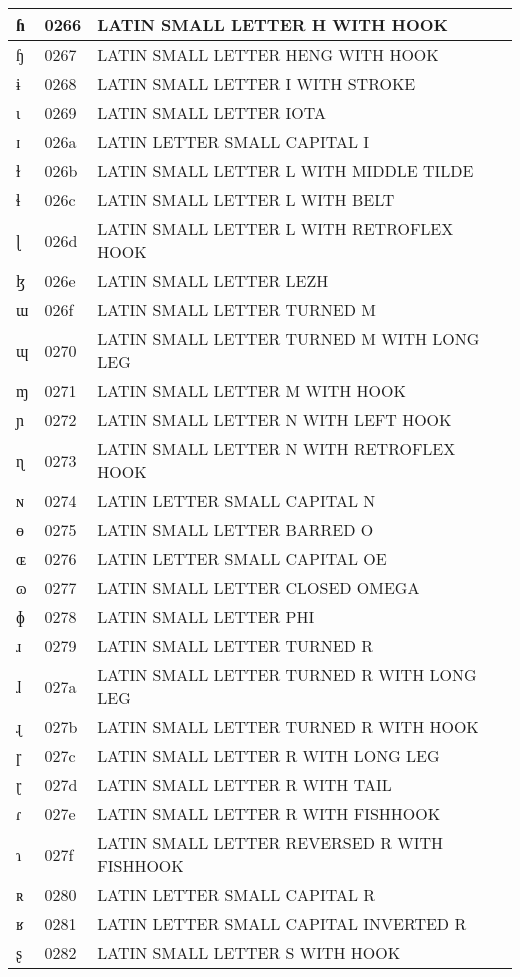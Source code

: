 \documentclass[12pt,letterpaper,openany]{book}
\begin{document}
\begin{center}
\begin{supertabular}{|m{0.25in}|m{0.5in}|m{4in}|}
ɦ & 0266 & LATIN SMALL LETTER H WITH HOOK\\\hline
ɧ & 0267 & LATIN SMALL LETTER HENG WITH HOOK\\\hline
ɨ & 0268 & LATIN SMALL LETTER I WITH STROKE\\\hline
ɩ & 0269 & LATIN SMALL LETTER IOTA\\\hline
ɪ & 026a & LATIN LETTER SMALL CAPITAL I\\\hline
ɫ & 026b & LATIN SMALL LETTER L WITH MIDDLE TILDE\\\hline
ɬ & 026c & LATIN SMALL LETTER L WITH BELT\\\hline
ɭ & 026d & LATIN SMALL LETTER L WITH RETROFLEX HOOK\\\hline
ɮ & 026e & LATIN SMALL LETTER LEZH\\\hline
ɯ & 026f & LATIN SMALL LETTER TURNED M\\\hline
ɰ & 0270 & LATIN SMALL LETTER TURNED M WITH LONG LEG\\\hline
ɱ & 0271 & LATIN SMALL LETTER M WITH HOOK\\\hline
ɲ & 0272 & LATIN SMALL LETTER N WITH LEFT HOOK\\\hline
ɳ & 0273 & LATIN SMALL LETTER N WITH RETROFLEX HOOK\\\hline
ɴ & 0274 & LATIN LETTER SMALL CAPITAL N\\\hline
ɵ & 0275 & LATIN SMALL LETTER BARRED O\\\hline
ɶ & 0276 & LATIN LETTER SMALL CAPITAL OE\\\hline
ɷ & 0277 & LATIN SMALL LETTER CLOSED OMEGA\\\hline
ɸ & 0278 & LATIN SMALL LETTER PHI\\\hline
ɹ & 0279 & LATIN SMALL LETTER TURNED R\\\hline
ɺ & 027a & LATIN SMALL LETTER TURNED R WITH LONG LEG\\\hline
ɻ & 027b & LATIN SMALL LETTER TURNED R WITH HOOK\\\hline
ɼ & 027c & LATIN SMALL LETTER R WITH LONG LEG\\\hline
ɽ & 027d & LATIN SMALL LETTER R WITH TAIL\\\hline
ɾ & 027e & LATIN SMALL LETTER R WITH FISHHOOK\\\hline
ɿ & 027f & LATIN SMALL LETTER REVERSED R WITH FISHHOOK\\\hline
ʀ & 0280 & LATIN LETTER SMALL CAPITAL R\\\hline
ʁ & 0281 & LATIN LETTER SMALL CAPITAL INVERTED R\\\hline
ʂ & 0282 & LATIN SMALL LETTER S WITH HOOK\\\hline

\end{supertabular}
\end{center}
\end{document}

